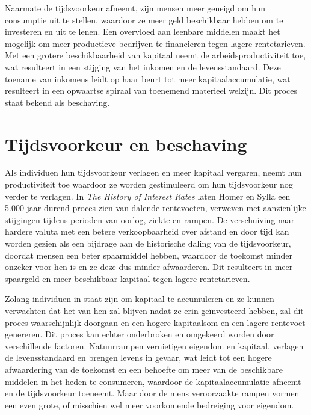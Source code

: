 Naarmate de tijdsvoorkeur afneemt, zijn mensen meer geneigd om hun consumptie uit te stellen, waardoor ze meer geld beschikbaar hebben om te investeren en uit te lenen. Een overvloed aan leenbare middelen maakt het mogelijk om meer productieve bedrijven te financieren tegen lagere rentetarieven. Met een grotere beschikbaarheid van kapitaal neemt de arbeidsproductiviteit toe, wat resulteert in een stijging van het inkomen en de levensstandaard. Deze toename van inkomens leidt op haar beurt tot meer kapitaalaccumulatie, wat resulteert in een opwaartse spiraal van toenemend materieel welzijn. Dit proces staat bekend als beschaving.

\hypertarget{tijdsvoorkeur-en-beschaving}{%
\section{Tijdsvoorkeur en beschaving}\label{tijdsvoorkeur-en-beschaving}}

Als individuen hun tijdsvoorkeur verlagen en meer kapitaal vergaren, neemt hun productiviteit toe waardoor ze worden gestimuleerd om hun tijdsvoorkeur nog verder te verlagen. In \emph{The History of Interest Rates} laten Homer en Sylla een 5.000 jaar durend proces zien van dalende rentevoeten, verweven met aanzienlijke stijgingen tijdens perioden van oorlog, ziekte en rampen.\autocite{148} De verschuiving naar hardere valuta met een betere verkoopbaarheid over afstand en door tijd kan worden gezien als een bijdrage aan de historische daling van de tijdsvoorkeur, doordat mensen een beter spaarmiddel hebben, waardoor de toekomst minder onzeker voor hen is en ze deze dus minder afwaarderen. Dit resulteert in meer spaargeld en meer beschikbaar kapitaal tegen lagere rentetarieven.

Zolang individuen in staat zijn om kapitaal te accumuleren en ze kunnen verwachten dat het van hen zal blijven nadat ze erin geïnvesteerd hebben, zal dit proces waarschijnlijk doorgaan en een hogere kapitaalsom en een lagere rentevoet genereren. Dit proces kan echter onderbroken en omgekeerd worden door verschillende factoren. Natuurrampen vernietigen eigendom en kapitaal, verlagen de levensstandaard en brengen levens in gevaar, wat leidt tot een hogere afwaardering van de toekomst en een behoefte om meer van de beschikbare middelen in het heden te consumeren, waardoor de kapitaalaccumulatie afneemt en de tijdsvoorkeur toeneemt. Maar door de mens veroorzaakte rampen vormen een even grote, of misschien wel meer voorkomende bedreiging voor eigendom.

